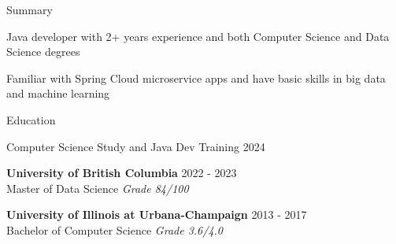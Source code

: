 \documentclass{resume} %
\begin{document}
\begin{skillSection}{Summary}
\item Java developer with 2+ years experience and both Computer Science and Data Science degrees
\item Familiar with Spring Cloud microservice apps and have basic skills in big data and machine learning
\end{skillSection}


\begin{rSection}{Education}

{Computer Science Study and Java Dev Training} \hfill {2024}

{\bf University of British Columbia} \hfill {2022 - 2023}
\\ Master of Data Science \hfill {\em{Grade 84/100}}

{\bf University of Illinois at Urbana-Champaign} \hfill {2013 - 2017}
\\ Bachelor of Computer Science \hfill {\em{Grade 3.6/4.0}}

\end{rSection}

\end{document}

